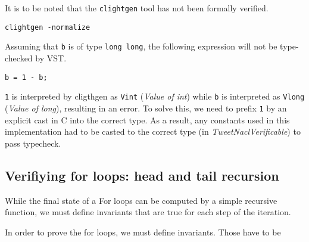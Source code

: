 It is to be noted that the \texttt{clightgen} tool has not been formally verified.

\texttt{clightgen -normalize}

Assuming that \texttt{b} is of type \texttt{long long}, the following expression
will not be type-checked by VST.

\texttt{b = 1 - b;}

\texttt{1} is interpreted by cligthgen as \texttt{Vint} (\textit{Value of int})
while \texttt{b} is interpreted as \texttt{Vlong} (\textit{Value of long}),
resulting in an error. To solve this, we need to prefix \texttt{1} by an
explicit cast in C into the correct type. As a result, any constants used in this
implementation had to be casted to the correct type
(in \textit{TweetNaclVerificable}) to pass typecheck.

\subsection{Verifiying for loops: head and tail recursion}

While the final state of a For loops can be computed by a simple recursive function,
we must define invariants that are true for each step of the iteration.



In order to prove the for loops, we must define invariants.
Those have to be
